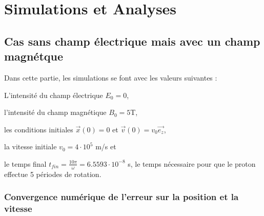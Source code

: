 \documentclass[a4paper,12pt,twoside]{article}
\begin{document}
\section{Simulations et Analyses}

	\subsection{Cas sans champ \'electrique mais avec un champ magn\'etque}
		Dans cette partie, les simulations se font avec les valeurs suivantes :
		
		L'intensit\'e du champ \'electrique $E_0=0$,
		
		l'intensit\'e du champ magn\'etique $B_0=5$T,
		
		les conditions initiales  $\vec{x}(0) = 0$ et $ \vec{v}(0) = v_0\vec{e_z}$,
		
		la vitesse initiale $v_0 = 4 \cdot 10^5$ m/s et 
	
		le temps final $t_{fin} = \frac{10 \pi}{\omega} = 6.5593 \cdot 10^{-8}$ s, le temps n\'ecessaire pour que le proton effectue 5 p\'eriodes de rotation. 
		
		
		\subsubsection{Convergence num\'erique de l'erreur sur la position et la vitesse}
		
\end{document}
